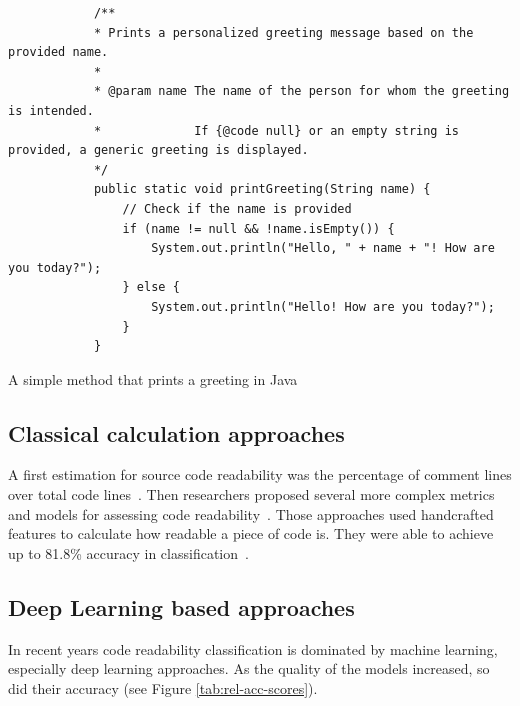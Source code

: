 \documentclass[%
class=scrreprt,
chapterprefix=false,%
open=right,%
twoside=false,%
paper=a4,%
logofile={Logo\_zentral\_farbig\_EN.png},%
thesistype=master,%
UKenglish,%
]{se2thesis}
\theoremstyle{definition}
\begin{document}
	
	\begin{listing}[!ht]
		\begin{verbatim}
			/**
			* Prints a personalized greeting message based on the provided name.
			*
			* @param name The name of the person for whom the greeting is intended.
			*             If {@code null} or an empty string is provided, a generic greeting is displayed.
			*/
			public static void printGreeting(String name) {
				// Check if the name is provided
				if (name != null && !name.isEmpty()) {
					System.out.println("Hello, " + name + "! How are you today?");
				} else {
					System.out.println("Hello! How are you today?");
				}
			}
		\end{verbatim}
		\caption{A simple method that prints a greeting in Java}
		\label{lst:print-greeting}
	\end{listing}
	

	
	
%	
%	
%	
	
\subsection{Classical calculation approaches} \label{Classical calculation approaches}
	A first estimation for source code readability was the percentage of comment lines over total code lines~\cite{aggarwal2002integrated}. Then researchers proposed several more complex metrics and models for assessing code readability~\cite{buse2009learning, posnett2011simpler, dorn2012general, scalabrino2018comprehensive}.
	Those approaches used handcrafted features to calculate how readable a piece of code is. They were able to achieve up to 81.8\% accuracy in classification~\cite{scalabrino2018comprehensive}.
	
\subsection{Deep Learning based approaches} \label{Deep Learning based approaches}
	In recent years code readability classification is dominated by machine learning, especially deep learning approaches. As the quality of the models increased, so did their accuracy (see Figure \ref{tab:rel-acc-scores}).
	
\end{document}
